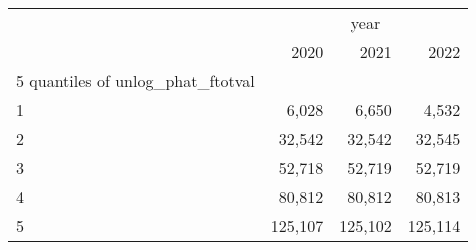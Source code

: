 \begin{tabular}{llll}
\cline{1-4}
\multicolumn{1}{c}{} &
  \multicolumn{3}{|c}{year} \\
\multicolumn{1}{c}{} &
  \multicolumn{1}{|r}{2020} &
  \multicolumn{1}{r}{2021} &
  \multicolumn{1}{r}{2022} \\
\cline{1-4}
\multicolumn{1}{l}{5 quantiles of unlog\_phat\_ftotval} &
  \multicolumn{1}{|r}{} &
  \multicolumn{1}{r}{} &
  \multicolumn{1}{r}{} \\
\multicolumn{1}{l}{\hspace{1em}1} &
  \multicolumn{1}{|r}{6,028} &
  \multicolumn{1}{r}{6,650} &
  \multicolumn{1}{r}{4,532} \\
\multicolumn{1}{l}{\hspace{1em}2} &
  \multicolumn{1}{|r}{32,542} &
  \multicolumn{1}{r}{32,542} &
  \multicolumn{1}{r}{32,545} \\
\multicolumn{1}{l}{\hspace{1em}3} &
  \multicolumn{1}{|r}{52,718} &
  \multicolumn{1}{r}{52,719} &
  \multicolumn{1}{r}{52,719} \\
\multicolumn{1}{l}{\hspace{1em}4} &
  \multicolumn{1}{|r}{80,812} &
  \multicolumn{1}{r}{80,812} &
  \multicolumn{1}{r}{80,813} \\
\multicolumn{1}{l}{\hspace{1em}5} &
  \multicolumn{1}{|r}{125,107} &
  \multicolumn{1}{r}{125,102} &
  \multicolumn{1}{r}{125,114} \\
\cline{1-4}
\end{tabular}

